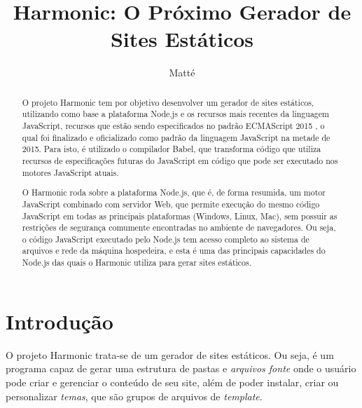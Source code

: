 \documentclass[ppginf, pep]{esinucpel}
\title{Harmonic: O Próximo Gerador de Sites Estáticos}
\author{Matté}{Fabrício da Silva}
\begin{document}

\maketitle
\sloppy


\tableofcontents

\begin{abstract}

O projeto Harmonic tem por objetivo desenvolver um gerador de sites estáticos, utilizando como base a plataforma Node.js e os recursos mais recentes da linguagem JavaScript, recursos que estão sendo especificados no padrão ECMAScript 2015 \cite{es2015}, o qual foi finalizado e oficializado como padrão da linguagem JavaScript na metade de 2015. Para isto, é utilizado o compilador Babel, que transforma código que utiliza recursos de especificações futuras do JavaScript em código que pode ser executado nos motores JavaScript atuais.

O Harmonic roda sobre a plataforma Node.js, que é, de forma resumida, um motor JavaScript combinado com servidor Web, que permite execução do mesmo código JavaScript em todas as principais plataformas (Windows, Linux, Mac), sem possuir as restrições de segurança comumente encontradas no ambiente de navegadores. Ou seja, o código JavaScript executado pelo Node.js tem acesso completo ao sistema de arquivos e rede da máquina hospedeira, e esta é uma das principais capacidades do Node.js das quais o Harmonic utiliza para gerar sites estáticos.


\end{abstract}

\chapter{Introdução}

O projeto Harmonic trata-se de um gerador de sites estáticos. Ou seja, é um programa capaz de gerar uma estrutura de pastas e \emph{arquivos fonte} onde o usuário pode criar e gerenciar o conteúdo de seu site, além de poder instalar, criar ou personalizar \emph{temas}, que são grupos de arquivos de \textit{template}.
\end{document}
